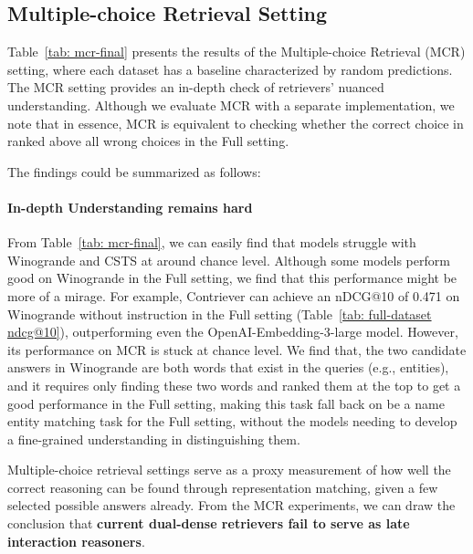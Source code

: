 \documentclass{article} %
\begin{document}
\subsection{Multiple-choice Retrieval Setting} Table~\ref{tab: mcr-final} presents the results of the Multiple-choice Retrieval (MCR) setting, where each dataset has a baseline characterized by random predictions. The MCR setting provides an in-depth check of retrievers' nuanced understanding. Although we evaluate MCR with a separate implementation, we note that in essence, MCR is equivalent to checking whether the correct choice in ranked above all wrong choices in the Full setting.


The findings could be summarized as follows:

\paragraph{In-depth Understanding remains hard}

From Table~\ref{tab: mcr-final}, we can easily find that models struggle with Winogrande \citep{sakaguchi2021winogrande} and CSTS \citep{deshpande2023csts} at around chance level. Although some models perform good on Winogrande in the Full setting, we find that this performance might be more of a mirage. For example, Contriever can achieve an nDCG@10 of 0.471 on Winogrande without instruction in the Full setting (Table~\ref{tab: full-dataset ndcg@10}), outperforming even the OpenAI-Embedding-3-large model. However, its performance on MCR is stuck at chance level. We find that, the two candidate answers in Winogrande are both words that exist in the queries (e.g., entities), and it requires only finding these two words and ranked them at the top to get a good performance in the Full setting, making this task fall back on be a name entity matching task for the Full setting, without the models needing to develop a fine-grained understanding in distinguishing them. 



Multiple-choice retrieval settings serve as a proxy measurement of how well the correct reasoning can be found through representation matching, given a few selected possible answers already. From the MCR experiments, we can draw the conclusion that \textbf{current dual-dense retrievers fail to serve as late interaction reasoners}.
\end{document}
